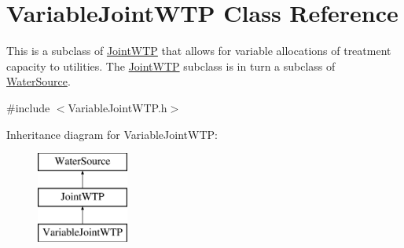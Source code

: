 \hypertarget{classVariableJointWTP}{}\section{Variable\+Joint\+W\+TP Class Reference}
\label{classVariableJointWTP}


This is a subclass of \mbox{\hyperlink{classJointWTP}{Joint\+W\+TP}} that allows for variable allocations of treatment capacity to utilities. The \mbox{\hyperlink{classJointWTP}{Joint\+W\+TP}} subclass is in turn a subclass of \mbox{\hyperlink{classWaterSource}{Water\+Source}}.  




{\ttfamily \#include $<$Variable\+Joint\+W\+T\+P.\+h$>$}

Inheritance diagram for Variable\+Joint\+W\+TP\+:\begin{figure}[H]
\begin{center}
\leavevmode
\includegraphics[height=3.000000cm]{classVariableJointWTP}
\end{center}
\end{figure}
